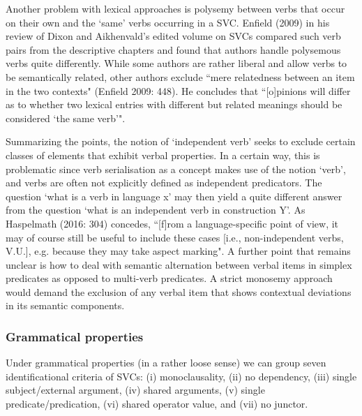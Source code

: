 Another problem with lexical approaches is polysemy between verbs that occur on their own and the `same' verbs occurring in a SVC. Enfield (2009) in his review of Dixon and Aikhenvald's edited volume on SVCs compared such verb pairs from the descriptive chapters and found that authors handle polysemous verbs quite differently. While some authors are rather liberal and allow verbs to be semantically related, other authors exclude ``mere relatedness between an item in the two contexts" (Enfield 2009: 448). He concludes that ``[o]pinions will differ as to whether two lexical entries with different but related meanings should be considered `the same verb’".

Summarizing the points, the notion of `independent verb' seeks to exclude certain classes of elements that exhibit verbal properties. In a certain way, this is problematic since verb serialisation as a concept makes use of the notion `verb', and verbs are often not explicitly defined as independent predicators. The question `what is a verb in language x' may then yield a quite different answer from the question `what is an independent verb in construction Y'. As Haspelmath (2016: 304) concedes, ``[f]rom a language-specific point of view, it may of course still be useful to include these cases [i.e., non-independent verbs, V.U.], e.g. because they may take aspect marking". A further point that remains unclear is how to deal with semantic alternation between verbal items in simplex predicates as opposed to multi-verb predicates. A strict monosemy approach would demand the exclusion of any verbal item that shows contextual deviations in its semantic components.

\subsubsection{Grammatical properties}\label{sec:gramprop}

Under grammatical properties (in a rather loose sense) we can group seven identificational criteria of SVCs: (i) monoclausality, (ii) no dependency, (iii) single subject/external argument, (iv) shared arguments, (v) single predicate/predication, (vi) shared operator value, and (vii) no junctor.

